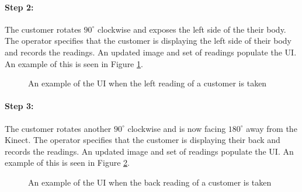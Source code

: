 \paragraph{Step 2: } The customer rotates $90^{\circ}$ clockwise and exposes the left side of the their body. The operator specifies that the customer is displaying the left side of their body and records the readings. An updated image and set of readings populate the UI. An example of this is seen in Figure \ref{fig:designVol2Left}. 

\begin{figure}[ht]
	\centering
	{%
		\setlength{\fboxsep}{0pt}%
		\setlength{\fboxrule}{0.5pt}%
		}
	\caption{An example of the UI when the left reading of a customer is taken}
	\label{fig:designVol2Left}
\end{figure}

\paragraph{Step 3: } The customer rotates another $90^{\circ}$ clockwise and is now facing $180^{\circ}$ away from the Kinect. The operator specifies that the customer is displaying their back and records the readings. An updated image and set of readings populate the UI. An example of this is seen in Figure \ref{fig:designVol2Back}. 

\begin{figure}[ht]
	\centering
	{%
		\setlength{\fboxsep}{0pt}%
		\setlength{\fboxrule}{0.5pt}%
		}
	\caption{An example of the UI when the back reading of a customer is taken}
	\label{fig:designVol2Back}
\end{figure}	

